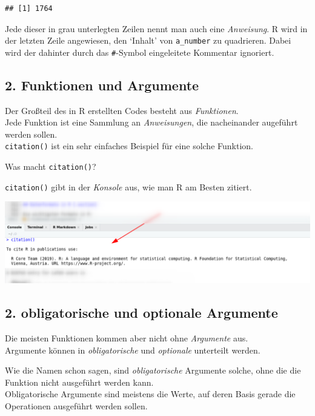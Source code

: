 \documentclass[
]{book}
\begin{document}
\begin{verbatim}
## [1] 1764
\end{verbatim}

Jede dieser in grau unterlegten Zeilen nennt man auch eine \emph{Anweisung}. R wird in der letzten Zeile angewiesen, den `Inhalt' von \texttt{a\_number} zu quadrieren. Dabei wird der dahinter durch das \texttt{\#}-Symbol eingeleitete Kommentar ignoriert.

\hypertarget{funktionen-und-argumente}{%
\subsection{2. Funktionen und Argumente}\label{funktionen-und-argumente}}

Der Großteil des in R erstellten Codes besteht aus \emph{Funktionen}.\\
Jede Funktion ist eine Sammlung an \emph{Anweisungen}, die nacheinander augeführt werden sollen.\\
\texttt{citation()} ist ein sehr einfaches Beispiel für eine solche Funktion.

Was macht \texttt{citation()}?

\texttt{citation()} gibt in der \emph{Konsole} aus, wie man R am Besten zitiert.

\begin{center}\includegraphics[width=0.8\linewidth]{imgs/citation} \end{center}

\hypertarget{obligatorische-und-optionale-argumente}{%
\subsection{2. obligatorische und optionale Argumente}\label{obligatorische-und-optionale-argumente}}

Die meisten Funktionen kommen aber nicht ohne \emph{Argumente} aus.\\
Argumente können in \emph{obligatorische} und \emph{optionale} unterteilt werden.

Wie die Namen schon sagen, sind \emph{obligatorische} Argumente solche, ohne die die Funktion nicht ausgeführt werden kann.\\
Obligatorische Argumente sind meistens die Werte, auf deren Basis gerade die Operationen ausgeführt werden sollen.
\end{document}
